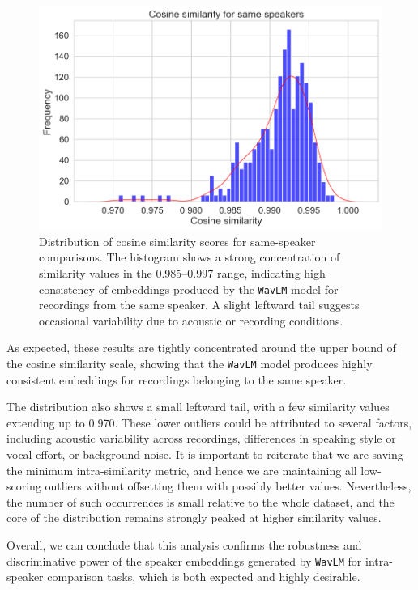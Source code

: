 \documentclass[conference]{IEEEtran}
\begin{document}
	\begin{figure}[H]
		\centering
		\includegraphics[width=1\linewidth]{img/img-self-similarity}
		\caption{Distribution of cosine similarity scores for same-speaker comparisons. The histogram shows a strong concentration of similarity values in the 0.985–0.997 range, indicating high consistency of embeddings produced by the \texttt{WavLM} model for recordings from the same speaker. A slight leftward tail suggests occasional variability due to acoustic or recording conditions.}
		\label{fig:img-self-similarity}
	\end{figure}
	
	As expected, these results are tightly concentrated around the upper bound of the cosine similarity scale, showing that the \texttt{WavLM} model produces highly consistent embeddings for recordings belonging to the same speaker. 
	
	The distribution also shows a small leftward tail, with a few similarity values extending up to 0.970. These lower outliers could be attributed to several factors, including acoustic variability across recordings, differences in speaking style or vocal effort, or background noise. It is important to reiterate that we are saving the minimum intra-similarity metric, and hence we are maintaining all low-scoring outliers without offsetting them with possibly better values. Nevertheless, the number of such occurrences is small relative to the whole dataset, and the core of the distribution remains strongly peaked at higher similarity values.
	
	Overall, we can conclude that this analysis confirms the robustness and discriminative power of the speaker embeddings generated by \texttt{WavLM} for intra-speaker comparison tasks, which is both expected and highly desirable.
	
\end{document}

